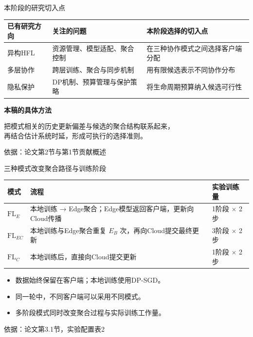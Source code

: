 \documentclass[aspectratio=169,11pt]{beamer}
\newcommand{\FlE}{\mathrm{FL}_{E}}
\newcommand{\FlEC}{\mathrm{FL}_{EC}}
\newcommand{\FlC}{\mathrm{FL}_{C}}
\newcommand{\key}[1]{{\color{Teal}\bfseries #1}}
\newcommand{\src}[1]{\vfill{\color{Gray}\fontsize{7.5}{9}\selectfont 依据：#1\par}}
\newcommand{\tight}{\setlength{\itemsep}{.18cm}}
\begin{document}
\begin{frame}{本阶段的研究切入点}
\renewcommand{\arraystretch}{1.45}
\begin{tabular}{@{}p{3.0cm}p{4.4cm}p{5.0cm}@{}}
\toprule
\textbf{已有研究方向} & \textbf{关注的问题} & \textbf{本阶段选择的切入点}\\
\midrule
异构HFL & 资源管理、模型适配、聚合控制 & 在三种协作模式之间选择客户端分配\\
多层协作 & 跨层训练、聚合与同步机制 & 用有限候选表示不同协作分布\\
隐私保护 & DP机制、预算管理与保护策略 & 将生命周期预算纳入候选可行性\\
\bottomrule
\end{tabular}\par
\par\vspace{.35cm}
\key{本稿的具体方法}\par\vspace{.15cm}
把模式相关的历史更新偏差与候选的聚合结构联系起来，\\
再结合估计系统时延，形成可执行的选择准则。
\src{论文第2节与第1节贡献概述}
\end{frame}

\begin{frame}{三种模式改变聚合路径与训练阶段}
\renewcommand{\arraystretch}{1.6}
\begin{tabular}{@{}p{1.35cm}p{8.8cm}p{2.2cm}@{}}
\toprule
\textbf{模式} & \textbf{流程} & \textbf{实验训练量}\\
\midrule
$\FlE$ & 本地训练 → Edge聚合；Edge模型返回客户端，更新向Cloud传播 & 1阶段 $\times$ 2步\\
$\FlEC$ & 本地训练与Edge聚合重复 $E_B$ 次，再向Cloud提交最终更新 & 3阶段 $\times$ 2步\\
$\FlC$ & 本地训练后，直接向Cloud提交更新 & 1阶段 $\times$ 2步\\
\bottomrule
\end{tabular}\par
\par\vspace{.25cm}
\begin{itemize}\tight
\item 数据始终保留在客户端；本地训练使用DP-SGD。
\item 同一轮中，不同客户端可以采用不同模式。
\item 多阶段模式同时改变聚合过程与实际训练工作量。
\end{itemize}
\src{论文第3.1节，实验配置表2}
\end{frame}
\end{document}
